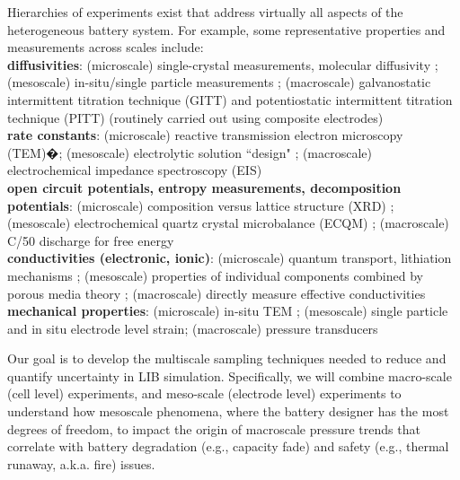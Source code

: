 \documentclass[11pt]{article}
\begin{document}
Hierarchies of experiments exist that address virtually all aspects 
of the heterogeneous battery system.  For example, some representative properties and measurements across scales include:\\
\textbf{diffusivities}: (microscale) single-crystal measurements, molecular diffusivity  \cite{Chung:2011}; (mesoscale) in-situ/single particle measurements \cite{Cui:2012};  (macroscale) galvanostatic intermittent titration technique (GITT) and potentiostatic intermittent titration technique (PITT) (routinely carried out using composite electrodes) \cite{Wen01121979}\\
\textbf{rate constants}: (microscale) reactive transmission electron microscopy (TEM)�\cite{Gu2012}; (mesoscale) electrolytic
solution ``design" \cite{Aurbach2004};  
(macroscale) electrochemical impedance spectroscopy (EIS) \cite{Meyers2000} \\
\textbf{open circuit potentials, entropy measurements, decomposition potentials}:  
(microscale) composition versus lattice structure (XRD) \cite{Ceder2009,Ohzuku1995};
(mesoscale) electrochemical quartz crystal microbalance (ECQM) \cite{Buttry1992};
(macroscale) C/50 discharge for free energy\\
\textbf{conductivities (electronic, ionic)}:  
(microscale) quantum transport, lithiation mechanisms \cite{Ceder2009};
(mesoscale) properties of individual components combined by porous media theory \cite{Stroud1975};
(macroscale) directly measure effective conductivities \\
\textbf{mechanical properties}: 
(microscale) in-situ TEM \cite{Wang:2012};
(mesoscale) single particle and in situ electrode level strain\cite{Qi:2010,Verbrugge:1999};
(macroscale) pressure transducers 

Our goal is to develop the multiscale sampling techniques
needed to reduce and quantify uncertainty in LIB simulation.
Specifically, we will combine
macro-scale (cell level) experiments,
and meso-scale (electrode level) experiments to
understand how mesoscale phenomena, where the
battery designer has the most degrees of freedom, to 
impact the
origin of macroscale
pressure trends that correlate with battery degradation (e.g.,
capacity fade) and safety (e.g., thermal runaway, a.k.a. fire) issues.
\end{document}
